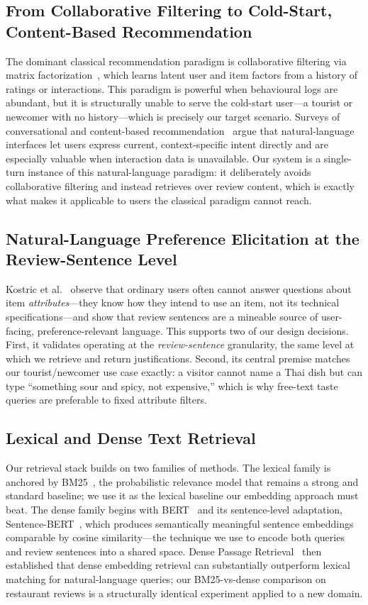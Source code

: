 \subsection{From Collaborative Filtering to Cold-Start, Content-Based Recommendation}
The dominant classical recommendation paradigm is collaborative filtering via matrix
factorization~\cite{koren2009mf}, which learns latent user and item factors from a
history of ratings or interactions. This paradigm is powerful when behavioural logs are
abundant, but it is structurally unable to serve the cold-start user---a tourist or
newcomer with no history---which is precisely our target scenario. Surveys of
conversational and content-based recommendation~\cite{gao2021crs} argue that
natural-language interfaces let users express current, context-specific intent directly
and are especially valuable when interaction data is unavailable. Our system is a
single-turn instance of this natural-language paradigm: it deliberately avoids
collaborative filtering and instead retrieves over review content, which is exactly what
makes it applicable to users the classical paradigm cannot reach.

\subsection{Natural-Language Preference Elicitation at the Review-Sentence Level}
Kostric et al.~\cite{kostric2024usage} observe that ordinary users often cannot answer
questions about item \emph{attributes}---they know how they intend to use an item, not
its technical specifications---and show that review sentences are a mineable source of
user-facing, preference-relevant language. This supports two of our design decisions.
First, it validates operating at the \emph{review-sentence} granularity, the same level
at which we retrieve and return justifications. Second, its central premise matches our
tourist/newcomer use case exactly: a visitor cannot name a Thai dish but can type
``something sour and spicy, not expensive,'' which is why free-text taste queries are
preferable to fixed attribute filters.

\subsection{Lexical and Dense Text Retrieval}
Our retrieval stack builds on two families of methods. The lexical family is anchored by
BM25~\cite{robertson2009bm25}, the probabilistic relevance model that remains a strong
and standard baseline; we use it as the lexical baseline our embedding approach must
beat. The dense family begins with BERT~\cite{devlin2019bert} and its sentence-level
adaptation, Sentence-BERT~\cite{reimers2019sbert}, which produces semantically
meaningful sentence embeddings comparable by cosine similarity---the technique we use to
encode both queries and review sentences into a shared space. Dense Passage
Retrieval~\cite{karpukhin2020dpr} then established that dense embedding retrieval can
substantially outperform lexical matching for natural-language queries; our BM25-vs-dense
comparison on restaurant reviews is a structurally identical experiment applied to a new
domain.

